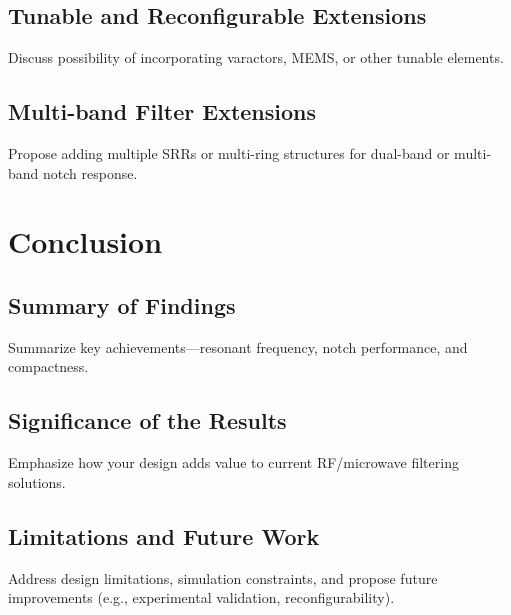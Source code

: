 \documentclass[conference]{IEEEtran}
\begin{document}
\subsection{Tunable and Reconfigurable Extensions}
Discuss possibility of incorporating varactors, MEMS, or other tunable elements.

\subsection{Multi-band Filter Extensions}
Propose adding multiple SRRs or multi-ring structures for dual-band or multi-band notch response.

\section{Conclusion}

\subsection{Summary of Findings}
Summarize key achievements—resonant frequency, notch performance, and compactness.

\subsection{Significance of the Results}
Emphasize how your design adds value to current RF/microwave filtering solutions.

\subsection{Limitations and Future Work}
Address design limitations, simulation constraints, and propose future improvements (e.g., experimental validation, reconfigurability).





\end{document}

